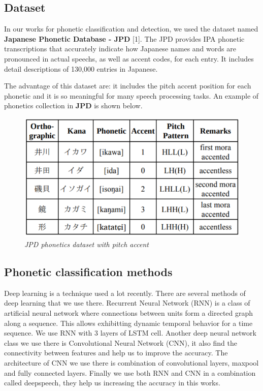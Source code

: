 \documentclass[conference]{IEEEtran}
\begin{document}
\subsection{Dataset}

In our works for phonetic classification and detection, we used the dataset named \textbf{Japanese Phonetic Database - JPD} [1]. The JPD provides IPA phonetic transcriptions that accurately indicate how Japanese names and words are pronounced in actual speechs, as well as accent codes, for each entry. It includes detail descriptions of 130,000 entries in Japanese.

The advantage of this dataset are: it includes the pitch accent position for each phonetic and it is so meaningful for many speech processing tasks. An example of phonetics collection in \textbf{JPD} is shown below.

\begin{figure}[h]
\includegraphics[scale=0.37]{dataset.png}
\centering
\caption{\textit{JPD phonetics dataset with pitch accent}}
\end{figure}

\subsection{Phonetic classification methods}

Deep learning is a technique used a lot recently. There are  several methods of deep learning that we use there. Recurrent Neural Network (RNN) is a class of artificial neural network where connections between units form a directed graph along a sequence. This allows exhibitting dynamic temporal behavior for a time sequence. We use RNN with 3 layers of LSTM cell. Another deep neural network class we use there is Convolutional Neural Network (CNN), it also find the connectivity between features and help us to improve the accuracy. The architecture of CNN we use there is combination of convolutional layers, maxpool and fully connected layers. Finally we use both RNN and CNN in a combination called deepspeech, they help us increasing the accuracy in this works.
\end{document}
